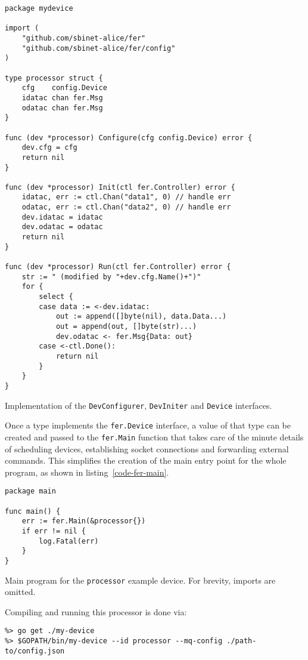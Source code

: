 \documentclass{webofc}
\begin{document}
\begin{listing}[h]
	\centering
\begin{verbatim}
package mydevice

import (
	"github.com/sbinet-alice/fer"
	"github.com/sbinet-alice/fer/config"
)

type processor struct {
	cfg    config.Device
	idatac chan fer.Msg
	odatac chan fer.Msg
}

func (dev *processor) Configure(cfg config.Device) error {
	dev.cfg = cfg
	return nil
}

func (dev *processor) Init(ctl fer.Controller) error {
	idatac, err := ctl.Chan("data1", 0) // handle err
	odatac, err := ctl.Chan("data2", 0) // handle err
	dev.idatac = idatac
	dev.odatac = odatac
	return nil
}

func (dev *processor) Run(ctl fer.Controller) error {
	str := " (modified by "+dev.cfg.Name()+")"
	for {
		select {
		case data := <-dev.idatac:
			out := append([]byte(nil), data.Data...)
			out = append(out, []byte(str)...)
			dev.odatac <- fer.Msg{Data: out}
		case <-ctl.Done():
			return nil
		}
	}
}
\end{verbatim}
\caption{Implementation of the \texttt{DevConfigurer}, \texttt{DevIniter} and \texttt{Device} interfaces.}
\label{code-fer-processor}
\end{listing}

Once a type implements the \texttt{fer.Device} interface, a value of that type can be created and passed to the \texttt{fer.Main} function that takes care of the minute details of scheduling devices, establishing socket connections and forwarding external commands.
This simplifies the creation of the main entry point for the whole program, as shown in listing~\ref{code-fer-main}.

\begin{listing}[h]
	\centering
\begin{verbatim}
package main

func main() {
	err := fer.Main(&processor{})
	if err != nil {
		log.Fatal(err)
	}
}
\end{verbatim}
	\caption{Main program for the \texttt{processor} example device. For brevity, imports are omitted.}
	\label{code-fer-main}
\end{listing}

Compiling and running this processor is done via:
\begin{verbatim}
%> go get ./my-device
%> $GOPATH/bin/my-device --id processor --mq-config ./path-to/config.json
\end{verbatim}
\end{document}
